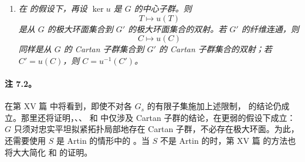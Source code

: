 \begin{enumerate}
\item[\emph{\SGAInlineRefTarget{sga3:xii:7.1:item:f}(f)}] \emph{在\textup{} 的假设下，再设 \(\ker u\) 是 \(G\) 的中心子群。则}
\[
  T\longmapsto u(T)
\]
\emph{是从 \(G\) 的极大环面集合到 \(G'\) 的极大环面集合的双射。若 \(G'\) 的纤维连通，则}
\[
  C\longmapsto u(C)
\]
\emph{同样是从 \(G\) 的 Cartan 子群集合到 \(G'\) 的 Cartan 子群集合的双射；若 \(C'=u(C)\)，则 \(C=u^{-1}(C')\)。}
\end{enumerate}
\paragraph{\textbf{注 7.2。}}
在第 XV 篇 中将看到，即使不对各 \(G_s\) 的有限子集施加上述限制，\textup{} 的结论仍成立。那里还将证明，\textup{}、\textup{}、\textup{} 和\textup{} 中仅涉及 Cartan 子群的结论，在更弱的假设下成立：\(G\) 只须对忠实平坦拟紧拓扑局部地存在 Cartan 子群，不必存在极大环面。为此，还需要使用 \(S\) 是 Artin 的情形中的 。当 \(S\) 不是 Artin 的时，第 XV 篇 的方法也将大大简化\textup{} 和\textup{} 的证明。
